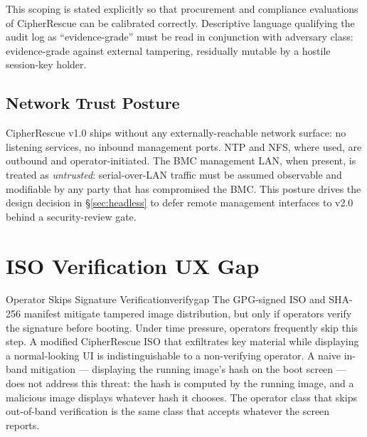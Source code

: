\documentclass[11pt,a4paper]{report}
\begin{document}
This scoping is stated explicitly so that procurement and compliance evaluations of CipherRescue can be calibrated correctly. Descriptive language qualifying the audit log as ``evidence-grade'' must be read in conjunction with adversary class: evidence-grade against external tampering, residually mutable by a hostile session-key holder.

\subsection{Network Trust Posture}
\label{sec:nettrust}

CipherRescue v1.0 ships without any externally-reachable network surface: no listening services, no inbound management ports. NTP and NFS, where used, are outbound and operator-initiated. The BMC management LAN, when present, is treated as \emph{untrusted}: serial-over-LAN traffic must be assumed observable and modifiable by any party that has compromised the BMC. This posture drives the design decision in \S\ref{sec:headless} to defer remote management interfaces to v2.0 behind a security-review gate.

\section{ISO Verification UX Gap}

\begin{edgecase}{Operator Skips Signature Verification}{verifygap}
The GPG-signed ISO and SHA-256 manifest mitigate tampered image distribution, but only if operators verify the signature before booting. Under time pressure, operators frequently skip this step. A modified CipherRescue ISO that exfiltrates key material while displaying a normal-looking UI is indistinguishable to a non-verifying operator. A naive in-band mitigation --- displaying the running image's hash on the boot screen --- does not address this threat: the hash is computed by the running image, and a malicious image displays whatever hash it chooses. The operator class that skips out-of-band verification is the same class that accepts whatever the screen reports.
\end{edgecase}
\end{document}
